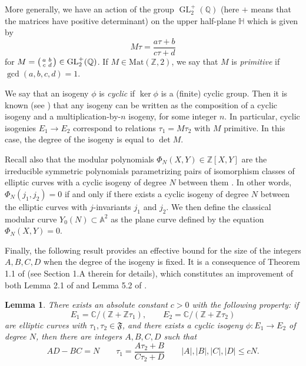 \documentclass[11pt,a4paper,reqno]{amsart}
\numberwithin{equation}{section}
\newcommand{\Z}{\mathbb{Z}}
\newcommand{\Q}{\mathbb{Q}}
\newcommand{\C}{\mathbb{C}}
\newcommand{\A}{\mathbb{A}}
\renewcommand{\H}{\mathbb{H}}
\newcommand{\pq}[1]{\left[ #1 \right]}
\newcommand{\abs}[1]{\left| #1 \right|}
\DeclareMathOperator{\GL}{GL}
\newtheorem{lemma}[theorem]{Lemma}
\theoremstyle{remark}
\theoremstyle{definition}
\theoremstyle{definition}
\begin{document}
More generally, we have an action of the group $\GL_2^+(\Q)$ (here $+$ means that the matrices have positive determinant) on the upper half-plane $\H$ which is given by
$$ M\tau=\dfrac{a\tau+b}{c\tau+d}$$ for $M=\begin{psmallmatrix}
a & b \\ 
c & d
\end{psmallmatrix}\in \GL_2^+(\Q)$. If $M \in \textrm{Mat}(\Z,2)$, we say that $M$ is \emph{primitive} if $\gcd(a,b,c,d)=1$. 

We say that an isogeny $\phi$ is \emph{cyclic} if $\ker \phi$ is a (finite) cyclic group. Then it is known (see \cite[Section 1.3]{DS05}) that any isogeny can be written as the composition of a cyclic isogeny and a multiplication-by-$n$ isogeny, for some integer $n$. In particular, cyclic isogenies $E_1 \rightarrow E_2$ correspond to relations $\tau_1 =M\tau_2$ with $M$ primitive. In this case, the degree of the isogeny is equal to $\det M$.

Recall also that the modular polynomials  $\Phi_N(X,Y) \in \Z\pq{X,Y}$ are the irreducible symmetric polynomials parametrizing pairs of isomorphism classes of elliptic curves with a cyclic isogeny of degree $N$ between them \cite[Chapter 5]{Lan87}. In other words, $\Phi_N(j_1,j_2)=0$ if and only if there exists a cyclic isogeny of degree $N$ between the elliptic curves with $j$-invariants $j_1$ and $j_2$. 
We then define the classical modular curve $Y_0(N) \subset \A^2$ as the plane curve defined by the equation $\Phi_N(X,Y)=0$.

Finally, the following result provides an effective bound for the size of the integers $A, B, C, D$ when the degree of the isogeny is fixed. It is a consequence of Theorem 1.1 of \cite{Orr18} (see Section 1.A therein for details), which constitutes an improvement of both Lemma 2.1 of \cite{MZ20b} and Lemma 5.2 of \cite{HP12}.

\begin{lemma}\label{lemma_bound_isogenie_matrix}
There exists an absolute constant $c > 0$ with the following property: if 
$$E_1=\C/(\Z+\Z\tau_1), \qquad E_2=\C/(\Z+\Z\tau_2)$$
are elliptic curves with $\tau_1, \tau_2 \in \mathfrak{F}$, and there exists a cyclic isogeny $ \phi: E_1 \rightarrow E_2 $ of degree $N$, then there are integers $ A,B,C,D $ such that 
\[ AD-BC=N \qquad \tau_1 =\dfrac{A\tau_2+B}{C\tau_2+D} \qquad \abs{A}, \abs{B},\abs{C}, \abs{D}\leq c N. \]
\end{lemma}
\end{document}
